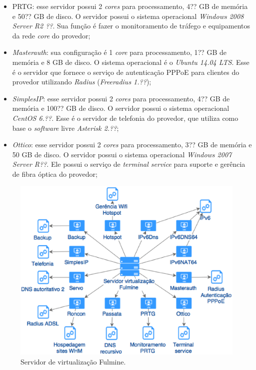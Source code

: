 \begin{itemize}
 \item \ac{PRTG}: esse servidor possui 2 \textit{cores} para processamento, 4?? GB de memória e 50?? GB de disco. O servidor possui o sistema 
 operacional \textit{Windows 2008 Server R2 ??}. Sua função é fazer o monitoramento de tráfego e equipamentos da rede \textit{core} do provedor;
 
 \item \textit{Masterauth}: sua configuração é 1 \textit{core} para processamento, 1?? GB de memória e 8 GB de disco. O sistema operacional é o 
 \textit{Ubuntu 14.04 \ac{LTS}}. Esse é o servidor que fornece o serviço de autenticação \ac{PPPoE} para clientes do provedor utilizando 
 \textit{Radius} (\textit{Freeradius 1.??});
 
 \item \textit{SimplesIP}: esse servidor possui 2 \textit{cores} para processamento, 4?? GB de memória e 100?? GB de disco. O servidor possui 
 o sistema operacional \textit{CentOS 6.??}. Esse é o servidor de telefonia do provedor, que utiliza como base o \textit{software} livre 
 \textit{Asterisk 2.??};
 
 \item \textit{Ottico}: esse servidor possui 2 \textit{cores} para processamento, 3?? GB de memória e 50 GB de disco. O servidor possui o sistema 
 operacional \textit{Windows 2007 Server R??}. Ele possui o serviço de \textit{terminal service} para suporte e gerência de fibra óptica do 
 provedor;
\end{itemize}

\begin{figure}[h!]
 \centering
 \includegraphics[width=430px]{img/servlog2.eps}
 \caption{Servidor de virtualização Fulmine.}
 \label{fig:servlog2}
\end{figure}

